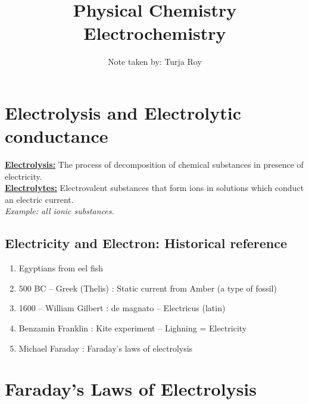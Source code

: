 \documentclass[12pt]{article}
\title{
    \textbf{Physical Chemistry} \\
    \textbf{Electrochemistry}
}
\author{
    Note taken by: Turja Roy
}
\date{}
\begin{document}
\maketitle

\section*{Electrolysis and Electrolytic conductance}
\underline{\textbf{Electrolysis:}} The process of decomposition of chemical substances in presence of electricity. \\


\underline{\textbf{Electrolytes:}} Electrovalent substances that form ions in solutions which conduct an electric current. \\
\textit{Example: all ionic substances.} \\

\subsection*{Electricity and Electron: Historical reference}
\begin{enumerate}
    \item Egyptians from eel fish
    \item 500 BC -- Greek (Thelis) : Static current from Amber (a type of fossil)
    \item 1600 -- William Gilbert : de magnato -- Electricus (latin)
    \item Benzamin Franklin : Kite experiment -- Lighning = Electricity
    \item Michael Faraday : Faraday's laws of electrolysis
\end{enumerate}

\section*{Faraday's Laws of Electrolysis}
\end{document}
